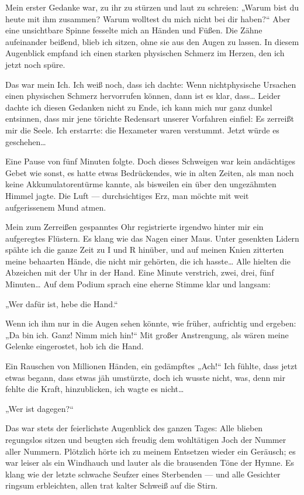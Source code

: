 Mein erster Gedanke war, zu ihr zu stürzen und laut zu schreien:
„Warum bist du heute mit ihm zusammen? Warum wolltest du mich nicht
bei dir haben?“ Aber eine unsichtbare Spinne fesselte mich an
Händen und Füßen. Die Zähne aufeinander beißend, blieb ich sitzen,
ohne sie aus den Augen zu lassen. In diesem Augenblick empfand ich
einen starken physischen Schmerz im Herzen, den ich jetzt noch
spüre.

Das war mein Ich. Ich weiß noch, dass ich dachte: Wenn
nichtphysische Ursachen einen physischen Schmerz hervorrufen
können, dann ist es klar, dass\ldots{} Leider dachte ich diesen Gedanken
nicht zu Ende, ich kann mich nur ganz dunkel entsinnen, dass mir
jene törichte Redensart unserer Vorfahren einfiel: Es zerreißt mir
die Seele. Ich erstarrte: die Hexameter waren verstummt. Jetzt
würde es geschehen\ldots{}

Eine Pause von fünf Minuten folgte. Doch dieses Schweigen war kein
andächtiges Gebet wie sonst, es hatte etwas Bedrückendes, wie in
alten Zeiten, als man noch keine Akkumulatorentürme kannte, als
bisweilen ein  über den ungezähmten Himmel jagte. Die Luft
— durchsichtiges Erz, man möchte mit weit aufgerissenem Mund
atmen.

Mein zum Zerreißen gespanntes Ohr registrierte irgendwo hinter mir
ein aufgeregtes Flüstern. Es klang wie das Nagen einer Maus. Unter
gesenkten Lidern spähte ich die ganze Zeit zu I und R hinüber, und
auf meinen Knien
zitterten meine behaarten Hände, die nicht mir gehörten, die ich
hasste\ldots{} Alle hielten die Abzeichen mit der Uhr in der Hand. Eine
Minute verstrich, zwei, drei, fünf Minuten\ldots{} Auf dem Podium sprach
eine eherne Stimme klar und langsam:

„Wer dafür ist, hebe die Hand.“

Wenn ich ihm nur in die Augen sehen könnte, wie früher, aufrichtig
und ergeben: „Da bin ich. Ganz! Nimm mich hin!“ Mit großer
Anstrengung, als wären meine Gelenke eingerostet, hob ich die
Hand.

Ein Rauschen von Millionen Händen, ein gedämpftes „Ach!“ Ich
fühlte, dass jetzt etwas begann, dass etwas jäh umstürzte, doch ich
wusste nicht, was, denn mir fehlte die Kraft, hinzublicken, ich
wagte es nicht\ldots{}

„Wer ist dagegen?“

Das war stets der feierlichste Augenblick des ganzen Tages: Alle
blieben regungslos sitzen und beugten sich freudig dem wohltätigen
Joch der Nummer aller Nummern. Plötzlich hörte ich zu meinem
Entsetzen wieder ein Geräusch; es war leiser als ein Windhauch und
lauter als die brausenden Töne der Hymne. Es klang wie der letzte
schwache Seufzer eines Sterbenden — und alle Gesichter ringsum
erbleichten, allen trat kalter Schweiß auf die Stirn.

